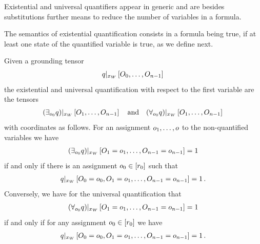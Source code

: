Existential and universal quantifiers appear in generic \firstOrderLogic{} and are besides substitutions further means to reduce the number of variables in a formula.


The semantics of existential quantification consists in a formula being true, if at least one state of the quantified variable is true, as we define next.

\begin{definition}
    Given a grounding tensor
    \begin{align*}
        {q}|_{x_{W}} \left[O_{0},\ldots,O_{n-1}\right] \,
    \end{align*}
    the existential and universal quantification with respect to the first variable are the tensors
    \begin{align*}
        {\left(\exists_{o_{0}}q\right)}|_{x_{W}} \left[O_{1},\ldots,O_{n-1}\right] \quad\text{and}\quad
        {\left(\forall_{o_{0}}q\right)}|_{x_{W}} \left[O_{1},\ldots,O_{n-1}\right] \,
    \end{align*}
    with coordinates as follows.
    For an assignment $o_{1},\ldots,o$ to the non-quantified variables we have
    \begin{align*}
        {\left(\exists_{o_{0}}q\right)}|_{x_{W}} \left[O_{1}=o_{1},\ldots,O_{n-1}=o_{n-1}\right] = 1
    \end{align*}
    if and only if there is an assignment $o_{0}\in[r_{0}]$ such that
    \begin{align*}
        {q}|_{x_{W}} \left[O_{0}=o_{0},O_{1}=o_{1},\ldots,O_{n-1}=o_{n-1}\right] = 1 \, .
    \end{align*}
    Conversely, we have for the universal quantification that
    \begin{align*}
        {\left(\forall_{o_{0}}q\right)}|_{x_{W}} \left[O_{1}=o_{1},\ldots,O_{n-1}=o_{n-1}\right] = 1
    \end{align*}
    if and only if for any assignment $o_{0}\in[r_{0}]$ we have
    \begin{align*}
        {q}|_{x_{W}} \left[O_{0}=o_{0},O_{1}=o_{1},\ldots,O_{n-1}=o_{n-1}\right] = 1 \, .
    \end{align*}
\end{definition}



